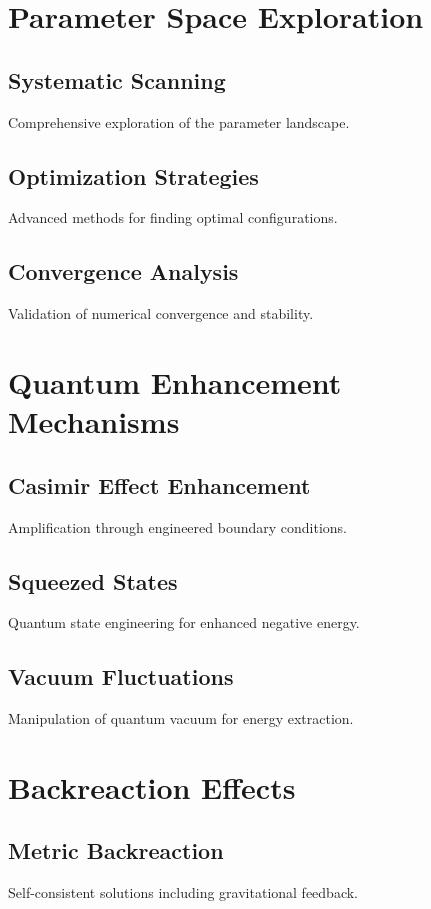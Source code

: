\documentclass{article}
\begin{document}
\section{Parameter Space Exploration}

\subsection{Systematic Scanning}
Comprehensive exploration of the parameter landscape.

\subsection{Optimization Strategies}
Advanced methods for finding optimal configurations.

\subsection{Convergence Analysis}
Validation of numerical convergence and stability.

\section{Quantum Enhancement Mechanisms}

\subsection{Casimir Effect Enhancement}
Amplification through engineered boundary conditions.

\subsection{Squeezed States}
Quantum state engineering for enhanced negative energy.

\subsection{Vacuum Fluctuations}
Manipulation of quantum vacuum for energy extraction.

\section{Backreaction Effects}

\subsection{Metric Backreaction}
Self-consistent solutions including gravitational feedback.
\end{document}
